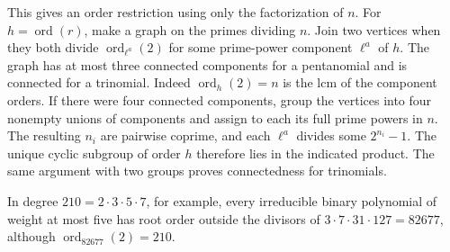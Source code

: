 \documentclass[11pt]{article}
\newcommand{\ord}{\operatorname{ord}}
\begin{document}
This gives an order restriction using only the factorization of \(n\).
For \(h=\ord(r)\), make a graph on the primes dividing \(n\).
Join two vertices when they both divide \(\ord_{\ell^a}(2)\) for
some prime-power component \(\ell^a\) of \(h\). The graph has at most
three connected components for a pentanomial and is connected for a
trinomial. Indeed \(\ord_h(2)=n\) is the lcm of the component orders.
If there were four connected components, group the vertices into
four nonempty unions of components and assign to each its full prime
powers in \(n\). The resulting \(n_i\) are pairwise coprime, and each
\(\ell^a\) divides some \(2^{n_i}-1\). The unique cyclic subgroup
of order \(h\) therefore lies in the indicated product. The same
argument with two groups proves connectedness for trinomials.

In degree \(210=2\cdot3\cdot5\cdot7\), for example, every irreducible
binary polynomial of weight at most five has root order outside the
divisors of \(3\cdot7\cdot31\cdot127=82677\), although
\(\ord_{82677}(2)=210\).
\end{document}
